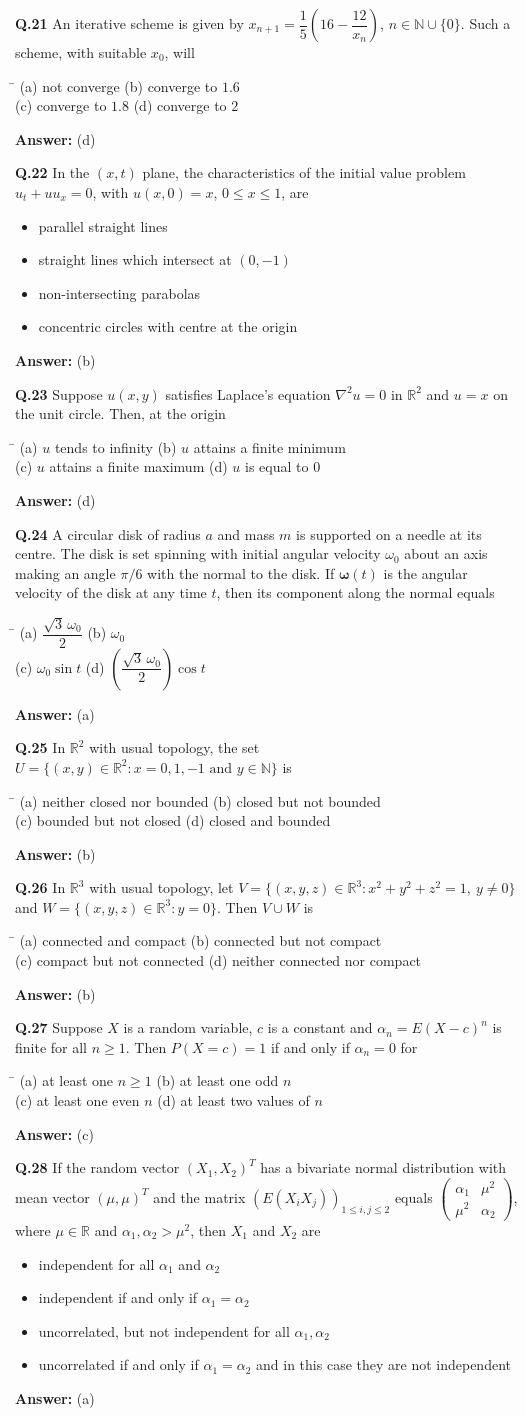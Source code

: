 \documentclass[11pt,a4paper]{article}
\newcommand{\optsfour}[4]{%
  \begin{tabbing}
    \hspace{0.48\linewidth}\=\kill
    (a) #1 \> (b) #2 \\[2pt]
    (c) #3 \> (d) #4
  \end{tabbing}%
}
\newcommand{\optslist}[4]{%
  \begin{itemize}
    \setlength{\itemsep}{2pt}\setlength{\parskip}{0pt}
    \item[(a)] #1
    \item[(b)] #2
    \item[(c)] #3
    \item[(d)] #4
  \end{itemize}%
}
\newcommand{\ans}[1]{\textbf{Answer:} #1\par\medskip}
\begin{document}
\textbf{Q.21} An iterative scheme is given by $x_{n+1} = \dfrac{1}{5}\!\left(16 - \dfrac{12}{x_n}\right)$, $n \in \mathbb{N} \cup \{0\}$. Such a scheme, with suitable $x_0$, will
\optsfour{not converge}{converge to $1.6$}{converge to $1.8$}{converge to $2$}
\ans{(d)}

\textbf{Q.22} In the $(x, t)$ plane, the characteristics of the initial value problem $u_t + u u_x = 0$, with $u(x,0) = x$, $0 \le x \le 1$, are
\optslist{parallel straight lines}{straight lines which intersect at $(0, -1)$}{non-intersecting parabolas}{concentric circles with centre at the origin}
\ans{(b)}

\textbf{Q.23} Suppose $u(x,y)$ satisfies Laplace's equation $\nabla^2 u = 0$ in $\mathbb{R}^2$ and $u = x$ on the unit circle. Then, at the origin
\optsfour{$u$ tends to infinity}{$u$ attains a finite minimum}{$u$ attains a finite maximum}{$u$ is equal to $0$}
\ans{(d)}

\textbf{Q.24} A circular disk of radius $a$ and mass $m$ is supported on a needle at its centre. The disk is set spinning with initial angular velocity $\omega_0$ about an axis making an angle $\pi/6$ with the normal to the disk. If $\boldsymbol{\omega}(t)$ is the angular velocity of the disk at any time $t$, then its component along the normal equals
\optsfour{$\dfrac{\sqrt{3}\,\omega_0}{2}$}{$\omega_0$}{$\omega_0\sin t$}{$\left(\dfrac{\sqrt{3}\,\omega_0}{2}\right)\cos t$}
\ans{(a)}

\textbf{Q.25} In $\mathbb{R}^2$ with usual topology, the set $U = \{(x,y) \in \mathbb{R}^2 : x = 0, 1, -1 \text{ and } y \in \mathbb{N}\}$ is
\optsfour{neither closed nor bounded}{closed but not bounded}{bounded but not closed}{closed and bounded}
\ans{(b)}

\textbf{Q.26} In $\mathbb{R}^3$ with usual topology, let $V = \{(x,y,z) \in \mathbb{R}^3 : x^2 + y^2 + z^2 = 1,\ y \ne 0\}$ and $W = \{(x,y,z) \in \mathbb{R}^3 : y = 0\}$. Then $V \cup W$ is
\optsfour{connected and compact}{connected but not compact}{compact but not connected}{neither connected nor compact}
\ans{(b)}

\textbf{Q.27} Suppose $X$ is a random variable, $c$ is a constant and $\alpha_n = E(X - c)^n$ is finite for all $n \ge 1$. Then $P(X = c) = 1$ if and only if $\alpha_n = 0$ for
\optsfour{at least one $n \ge 1$}{at least one odd $n$}{at least one even $n$}{at least two values of $n$}
\ans{(c)}

\textbf{Q.28} If the random vector $(X_1, X_2)^T$ has a bivariate normal distribution with mean vector $(\mu, \mu)^T$ and the matrix $(E(X_i X_j))_{1 \le i,j \le 2}$ equals $\begin{pmatrix} \alpha_1 & \mu^2 \\ \mu^2 & \alpha_2 \end{pmatrix}$, where $\mu \in \mathbb{R}$ and $\alpha_1, \alpha_2 > \mu^2$, then $X_1$ and $X_2$ are
\optslist{independent for all $\alpha_1$ and $\alpha_2$}{independent if and only if $\alpha_1 = \alpha_2$}{uncorrelated, but not independent for all $\alpha_1, \alpha_2$}{uncorrelated if and only if $\alpha_1 = \alpha_2$ and in this case they are not independent}
\ans{(a)}
\end{document}
